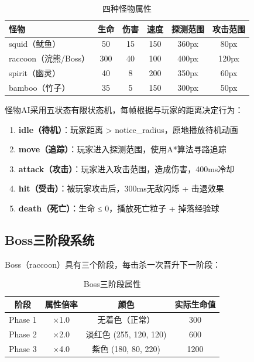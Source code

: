 \documentclass[12pt,a4paper]{ctexart}
\begin{document}
\begin{table}[H]
\centering
\small
\begin{tabular}{lccccc}
\toprule
\textbf{怪物} & \textbf{生命} & \textbf{伤害} & \textbf{速度} & \textbf{探测范围} & \textbf{攻击范围} \\
\midrule
squid（鱿鱼） & 50 & 15 & 150 & 360px & 80px \\
raccoon（浣熊/Boss） & 300 & 40 & 100 & 400px & 120px \\
spirit（幽灵） & 40 & 8 & 200 & 350px & 60px \\
bamboo（竹子） & 35 & 5 & 150 & 300px & 50px \\
\bottomrule
\end{tabular}
\caption{四种怪物属性}
\end{table}

怪物AI采用五状态有限状态机，每帧根据与玩家的距离决定行为：

\begin{enumerate}[label=\textbf{状态\arabic*：}]
    \item \textbf{idle（待机）}：玩家距离 > notice\_radius，原地播放待机动画
    \item \textbf{move（追踪）}：玩家进入探测范围，使用A*算法寻路追踪
    \item \textbf{attack（攻击）}：玩家进入攻击范围，造成伤害，400ms冷却
    \item \textbf{hit（受击）}：被玩家攻击后，300ms无敌闪烁 + 击退效果
    \item \textbf{death（死亡）}：生命 ≤ 0，播放死亡粒子 + 掉落经验球
\end{enumerate}

\subsection{Boss三阶段系统}

Boss（raccoon）具有三个阶段，每击杀一次晋升下一阶段：

\begin{table}[H]
\centering
\small
\begin{tabular}{cccc}
\toprule
\textbf{阶段} & \textbf{属性倍率} & \textbf{颜色} & \textbf{实际生命值} \\
\midrule
Phase 1 & ×1.0 & 无着色（正常） & 300 \\
Phase 2 & ×2.0 & 淡红色 (255, 120, 120) & 600 \\
Phase 3 & ×4.0 & 紫色 (180, 80, 220) & 1200 \\
\bottomrule
\end{tabular}
\caption{Boss三阶段属性}
\end{table}
\end{document}
